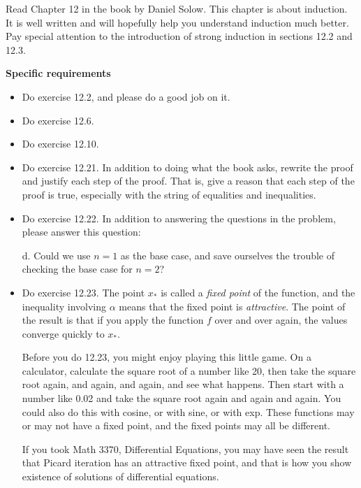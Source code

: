
Read Chapter 12 in the book by Daniel Solow.
This chapter is about induction.
It is well written and will hopefully help you understand induction much better.
Pay special attention to the introduction of strong induction in sections 12.2 and 12.3.

\vspace{0.1in}
\noindent
{\bf Specific requirements}
\vspace*{-0.15in}

\begin{itemize}
\item Do exercise 12.2, and please do a good job on it.

\item Do exercise 12.6.

\item Do exercise 12.10.

\item Do exercise 12.21.  In addition to doing what the book asks, rewrite the proof and justify each step of the proof.
That is, give a reason that each step of the proof is true, especially with the string of equalities and inequalities.

\item Do exercise 12.22.  In addition to answering the questions in the problem, please answer this question:

d. Could we use $n=1$ as the base case, and save ourselves the trouble of checking the base case for $n=2$?

\item Do exercise 12.23.  The point $x_*$ is called a {\em fixed point} of the function, and the inequality involving $\alpha$ means that the fixed point is {\em attractive}.  
The point of the result is that if you apply the function $f$ over and over again, the values converge quickly to $x_*$.

Before you do 12.23, you might enjoy playing this little game.
On a calculator, calculate the square root of a number like 20, then take the square root again, and again, and again, and see what happens.
Then start with a number like 0.02 and take the square root again and again and again.
You could also do this with cosine, or with sine, or with exp.
These functions may or may not have a fixed point, and the fixed points may all be different.

If you took Math 3370, Differential Equations, you may have seen the result that Picard iteration has an attractive fixed point, and that is how you show existence of solutions of differential equations.


\end{itemize}
